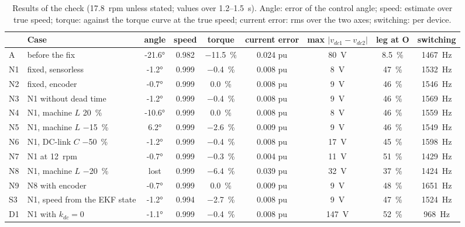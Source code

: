 \documentclass[10pt,a4paper]{scrartcl}
\begin{document}
\begin{onehalfspace}
\begin{table}[!htb]
\centering
\caption{Results of the check (\SI{17.8}{rpm} unless stated; values over 1.2--\SI{1.5}{s}). Angle: error of the control angle; speed: estimate over true speed; torque: against the torque curve at the true speed; current error: rms over the two axes; switching: per device.}
\label{tab:results}
\small
\setlength{\tabcolsep}{4pt}
\begin{tabular}{llccccccc}
\toprule
 & Case & angle & speed & torque & current error & max $|v_{dc1} - v_{dc2}|$ & leg at O & switching \\
\midrule
A & before the fix & \ang{-21.6} & 0.982 & \SI{-11.5}{\percent} & 0.024 pu & \SI{80}{V} & \SI{8.5}{\percent} & \SI{1467}{Hz} \\
N1 & fixed, sensorless & \ang{-1.2} & 0.999 & \SI{-0.4}{\percent} & 0.008 pu & \SI{8}{V} & \SI{47}{\percent} & \SI{1532}{Hz} \\
N2 & fixed, encoder & \ang{-0.7} & 0.999 & \SI{0.0}{\percent} & 0.008 pu & \SI{9}{V} & \SI{46}{\percent} & \SI{1546}{Hz} \\
N3 & N1 without dead time & \ang{-1.2} & 0.999 & \SI{-0.4}{\percent} & 0.008 pu & \SI{9}{V} & \SI{46}{\percent} & \SI{1569}{Hz} \\
N4 & N1, machine $L$ \SI{+20}{\percent} & \ang{-10.6} & 0.999 & \SI{0.0}{\percent} & 0.008 pu & \SI{8}{V} & \SI{46}{\percent} & \SI{1559}{Hz} \\
N5 & N1, machine $L$ \SI{-15}{\percent} & \ang{+6.2} & 0.999 & \SI{-2.6}{\percent} & 0.009 pu & \SI{9}{V} & \SI{46}{\percent} & \SI{1549}{Hz} \\
N6 & N1, DC-link $C$ \SI{-50}{\percent} & \ang{-1.2} & 0.999 & \SI{-0.4}{\percent} & 0.008 pu & \SI{17}{V} & \SI{45}{\percent} & \SI{1598}{Hz} \\
N7 & N1 at \SI{12}{rpm} & \ang{-0.7} & 0.999 & \SI{-0.3}{\percent} & 0.004 pu & \SI{11}{V} & \SI{51}{\percent} & \SI{1429}{Hz} \\
N8 & N1, machine $L$ \SI{-20}{\percent} & lost & 0.999 & \SI{-6.4}{\percent} & 0.039 pu & \SI{32}{V} & \SI{37}{\percent} & \SI{1424}{Hz} \\
N9 & N8 with encoder & \ang{-0.7} & 0.999 & \SI{0.0}{\percent} & 0.009 pu & \SI{9}{V} & \SI{48}{\percent} & \SI{1651}{Hz} \\
S3 & N1, speed from the EKF state & \ang{-1.2} & 0.994 & \SI{-2.7}{\percent} & 0.008 pu & \SI{9}{V} & \SI{47}{\percent} & \SI{1524}{Hz} \\
D1 & N1 with $k_{dc} = 0$ & \ang{-1.1} & 0.999 & \SI{-0.4}{\percent} & 0.008 pu & \SI{147}{V} & \SI{52}{\percent} & \SI{968}{Hz} \\
\bottomrule
\end{tabular}
\end{table}


\end{onehalfspace}
\end{document}
